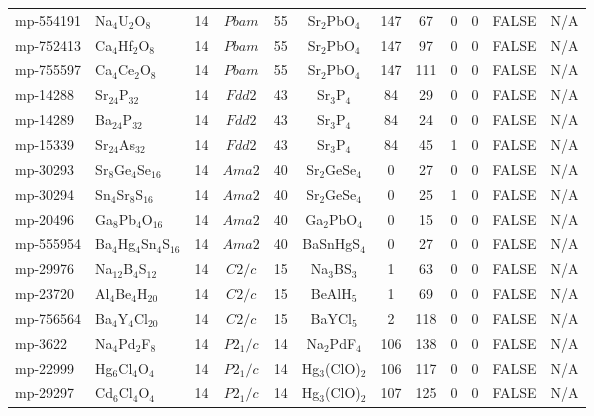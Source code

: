 {\begin{longtable}{llcccccccccc}
    mp-554191 & Na$_{4}$U$_{2}$O$_{8}$ & 14    & $Pbam$ & 55    & Sr$_{2}$PbO$_{4}$ & 147   & 67    & 0     & 0     & FALSE & N/A \\
    mp-752413 & Ca$_{4}$Hf$_{2}$O$_{8}$ & 14    & $Pbam$ & 55    & Sr$_{2}$PbO$_{4}$ & 147   & 97    & 0     & 0     & FALSE & N/A \\
    mp-755597 & Ca$_{4}$Ce$_{2}$O$_{8}$ & 14    & $Pbam$ & 55    & Sr$_{2}$PbO$_{4}$ & 147   & 111   & 0     & 0     & FALSE & N/A \\
    mp-14288 & Sr$_{24}$P$_{32}$ & 14    & $Fdd2$ & 43    & Sr$_{3}$P$_{4}$ & 84    & 29    & 0     & 0     & FALSE & N/A \\
    mp-14289 & Ba$_{24}$P$_{32}$ & 14    & $Fdd2$ & 43    & Sr$_{3}$P$_{4}$ & 84    & 24    & 0     & 0     & FALSE & N/A \\
    mp-15339 & Sr$_{24}$As$_{32}$ & 14    & $Fdd2$ & 43    & Sr$_{3}$P$_{4}$ & 84    & 45    & 1     & 0     & FALSE & N/A \\
    mp-30293 & Sr$_{8}$Ge$_{4}$Se$_{16}$ & 14    & $Ama2$ & 40    & Sr$_{2}$GeSe$_{4}$ & 0     & 27    & 0     & 0     & FALSE & N/A \\
    mp-30294 & Sn$_{4}$Sr$_{8}$S$_{16}$ & 14    & $Ama2$ & 40    & Sr$_{2}$GeSe$_{4}$ & 0     & 25    & 1     & 0     & FALSE & N/A \\
    mp-20496 & Ga$_{8}$Pb$_{4}$O$_{16}$ & 14    & $Ama2$ & 40    & Ga$_{2}$PbO$_{4}$ & 0     & 15    & 0     & 0     & FALSE & N/A \\
    mp-555954 & Ba$_{4}$Hg$_{4}$Sn$_{4}$S$_{16}$ & 14    & $Ama2$ & 40    & BaSnHgS$_{4}$ & 0     & 27    & 0     & 0     & FALSE & N/A \\
    mp-29976 & Na$_{12}$B$_{4}$S$_{12}$ & 14    & $C2/c$ & 15    & Na$_{3}$BS$_{3}$ & 1     & 63    & 0     & 0     & FALSE & N/A \\
    mp-23720 & Al$_{4}$Be$_{4}$H$_{20}$ & 14    & $C2/c$ & 15    & BeAlH$_{5}$ & 1     & 69    & 0     & 0     & FALSE & N/A \\
    mp-756564 & Ba$_{4}$Y$_{4}$Cl$_{20}$ & 14    & $C2/c$ & 15    & BaYCl$_{5}$ & 2     & 118   & 0     & 0     & FALSE & N/A \\
    mp-3622 & Na$_{4}$Pd$_{2}$F$_{8}$ & 14    & $P2_1/c$ & 14    & Na$_{2}$PdF$_{4}$ & 106   & 138   & 0     & 0     & FALSE & N/A \\
    mp-22999 & Hg$_{6}$Cl$_{4}$O$_{4}$ & 14    & $P2_1/c$ & 14    & Hg$_{3}$(ClO)$_{2}$ & 106   & 117   & 0     & 0     & FALSE & N/A \\
    mp-29297 & Cd$_{6}$Cl$_{4}$O$_{4}$ & 14    & $P2_1/c$ & 14    & Hg$_{3}$(ClO)$_{2}$ & 107   & 125   & 0     & 0     & FALSE & N/A \\

\end{longtable}}
